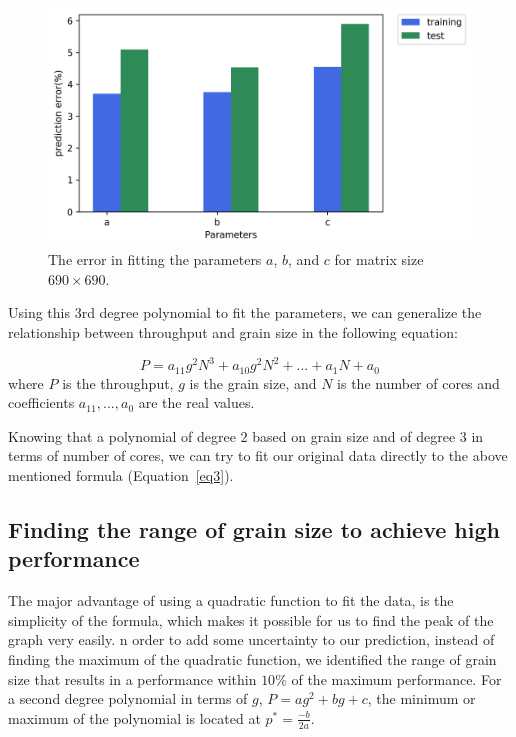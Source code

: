 \vspace{\baselineskip}	
\begin{figure}[H]
	\centering
	\includegraphics[scale=.45]{images/polyfit/fig_690_params_error.png}
	
	\caption{The error in fitting the parameters $a$, $b$, and $c$ for matrix size $690\times690$.}	
	\label{fig16}
\end{figure}

Using this $3$rd degree polynomial to fit the parameters, we can generalize the relationship between throughput and grain size in the following equation:

\begin{equation}\label{eq3}
P=a_{11}g^2N^3+a_{10}g^2N^2+...+a_1N+a_0
\end{equation}
where $P$ is the throughput, $g$ is the grain size, and $N$ is the number of cores and coefficients $a_{11},...,a_0$ are the real values.

Knowing that a polynomial of degree $2$ based on grain size and of degree $3$ in terms of number of cores, we can try to fit our original data directly to the above mentioned formula (Equation~\ref{eq3}).

\vspace{\baselineskip}	
\subsection{Finding the range of grain size to achieve high performance}
The major advantage of using a quadratic function to fit the data, is the simplicity of the formula, which makes it possible for us to find the peak of the graph very easily. n order to add some uncertainty to our prediction, instead of finding the maximum of the quadratic function, we identified the range of grain size that results in a performance within $10\%$ of the maximum performance. For a second degree polynomial in terms of $g$, $P=ag^2+bg+c$, the minimum or maximum of the polynomial is located at $p^{*}=\frac{-b}{2a}$.    

